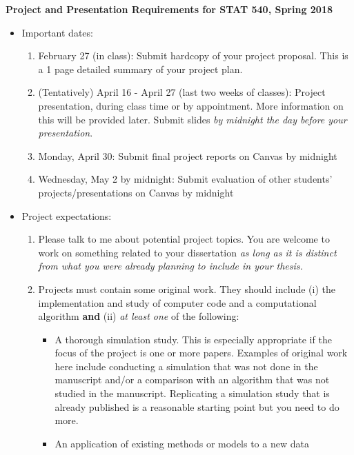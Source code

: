 \documentclass[10pts]{article}
\begin{document}
\pagestyle{empty}
\Large
\begin{center}
{\bf  Project and Presentation Requirements for STAT 540, Spring 2018}\\
\end{center}
\normalsize
\begin{itemize}
\item Important dates: 
\begin{enumerate}
\item February 27 (in class): Submit hardcopy of your project proposal.
  This is a 1 page detailed summary of your project plan.
\item (Tentatively) April 16 - April 27 (last two weeks of classes): Project presentation,
  during class time or by appointment. More information on this will
  be provided later. Submit slides {\it by midnight the day before
    your presentation}.
\item Monday, April 30: Submit final project reports on Canvas by midnight
\item Wednesday, May 2 by midnight: Submit evaluation of other students' projects/presentations on Canvas by midnight
\end{enumerate}
\item Project expectations:
\begin{enumerate}
\item Please talk to me about potential project topics. You are
  welcome to work on something related to your dissertation {\it as
    long as it is distinct from what you were already planning to
    include in your thesis.}
\item Projects must contain some original work. They should
  include (i) the implementation and study of computer code and a
  computational algorithm {\bf and} (ii) {\it at least one} of the
  following:
\begin{itemize}
\item A thorough simulation study. This is especially appropriate if
  the focus of the project is one or more papers. Examples of
  original work here include conducting a simulation that was not done
  in the manuscript and/or a comparison with an algorithm that was not
  studied in the manuscript. Replicating a simulation study that is
  already published is a reasonable starting point but you need to do
  more.
\item An application of existing methods or models to a new data

\end{itemize}
\end{enumerate}
\end{itemize}
\end{document}

